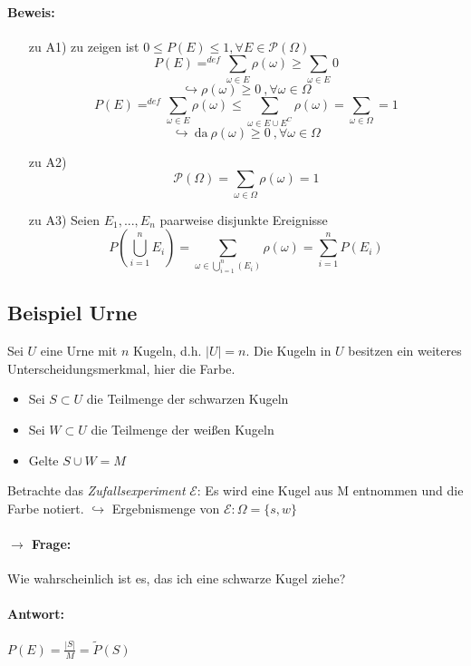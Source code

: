 \documentclass[12pt,a4paper]{article}
\begin{document}
	\paragraph{Beweis: }	 
	\begin{itemize}
		\item[zu A1) ] zu zeigen ist $0\leq P(E)\leq 1,\forall E\in\mathcal{P}(\Omega)$
		$$P(E)=^{def}\sum_{\omega\in E}\rho(\omega)\geq\sum_{\omega\in E}0$$
		$$\hookrightarrow \rho(\omega)\geq 0\: , \forall\omega\in\Omega$$
		$$P(E)=^{def}\sum_{\omega\in E}\rho(\omega)\leq\sum_{\omega\in E\cup E^C}\rho(\omega)=\sum_{\omega
		\in\Omega}=1$$
		$$\hookrightarrow \: \text{da} \: \rho(\omega)\geq 0 \: , \forall\omega\in\Omega$$
		\item[zu A2) ] $$\mathcal{P}(\Omega) = \sum_{\omega\in\Omega}\rho(\omega)=1$$
		\item[zu A3) ] Seien $E_1,...,E_n$ paarweise disjunkte Ereignisse
		$$P\left(\bigcup_{i=1}^n E_i\right)=\sum_{\omega\in\bigcup_{i=1}^n (E_i)}\rho(\omega)=
		\sum_{i=1}^n P(E_i)$$
	\end{itemize}
	\subsection{Beispiel Urne}
	Sei $U$ eine Urne mit $n$ Kugeln, d.h. $|U| = n$. Die Kugeln in $U$ besitzen ein weiteres 
	Unterscheidungsmerkmal, hier die Farbe.
	\begin{itemize}
		\item Sei $S\subset U$ die Teilmenge der schwarzen Kugeln
		\item Sei $W\subset U$ die Teilmenge der weißen Kugeln
		\item Gelte $S\cup W=M$
	\end{itemize}
	Betrachte das \textit{Zufallsexperiment} $\mathcal{E}$: \newline
	Es wird eine Kugel aus M entnommen und die Farbe notiert. \newline
	$\hookrightarrow$ Ergebnismenge von $\mathcal{E}: \Omega=\{s,w\}$ 
	\paragraph{$\rightarrow$ Frage: }	
	Wie wahrscheinlich ist es, das ich eine schwarze Kugel ziehe? 
	\paragraph{Antwort: }
	$P(E)=\frac{|S|}{M}=\tilde{P}(S)$
\end{document}
